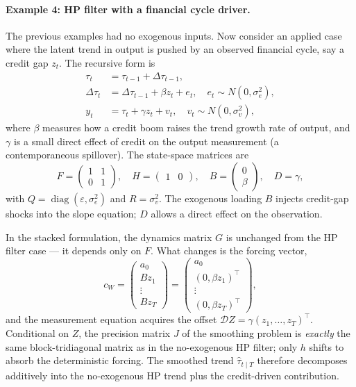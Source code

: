 \documentclass[11pt]{article}
\newcommand{\diag}{\operatorname{diag}}
\begin{document}
\paragraph{Example 4: HP filter with a financial cycle driver.}

The previous examples had no exogenous inputs.  Now consider an
applied case where the latent trend in output is pushed by an
observed financial cycle, say a credit gap $z_t$.  The recursive form
is
\begin{align}
\tau_t        &= \tau_{t-1}+\Delta\tau_{t-1},\\
\Delta\tau_t  &= \Delta\tau_{t-1}+\beta z_t+e_t,\quad e_t\sim N(0,\sigma_e^2),\\
y_t           &= \tau_t+\gamma z_t+v_t,\quad v_t\sim N(0,\sigma_v^2),
\end{align}
where $\beta$ measures how a credit boom raises the trend growth rate
of output, and $\gamma$ is a small direct effect of credit on the
output measurement (a contemporaneous spillover).  The state-space
matrices are
\begin{equation}
F=\begin{pmatrix}1 & 1\\ 0 & 1\end{pmatrix},
\quad
H=\begin{pmatrix}1 & 0\end{pmatrix},
\quad
B=\begin{pmatrix}0\\ \beta\end{pmatrix},
\quad
D=\gamma,
\end{equation}
with $Q=\diag(\varepsilon,\sigma_e^2)$ and $R=\sigma_v^2$.  The
exogenous loading $B$ injects credit-gap shocks into the slope
equation; $D$ allows a direct effect on the observation.

In the stacked formulation, the dynamics matrix $G$ is unchanged from
the HP filter case --- it depends only on $F$.  What changes is the
forcing vector,
\begin{equation}
c_W=\begin{pmatrix}a_0\\ Bz_1\\ \vdots\\ Bz_T\end{pmatrix}=
\begin{pmatrix}a_0\\ (0,\beta z_1)^\top\\ \vdots\\ (0,\beta z_T)^\top\end{pmatrix},
\end{equation}
and the measurement equation acquires the offset $\mathcal D Z=\gamma
(z_1,\ldots,z_T)^\top$.  Conditional on $Z$, the precision matrix $J$
of the smoothing problem is \emph{exactly} the same block-tridiagonal
matrix as in the no-exogenous HP filter; only $h$ shifts to absorb
the deterministic forcing.  The smoothed trend $\widehat\tau_{t\mid T}$
therefore decomposes additively into the no-exogenous HP trend plus
the credit-driven contribution.
\end{document}
